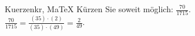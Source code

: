 \begin{MAufgabe}{Kuerzen}{kr, MaTeX}
K\"urzen Sie soweit m\"oglich: $\frac{70}{1715}$.\\ 
\ifLsg\MLoesung
\quad $\frac{70}{1715}=\frac{(35)\cdot(2)}{(35)\cdot(49)}=\frac{2}{49}$.\else\relax\fi
 \end{MAufgabe}